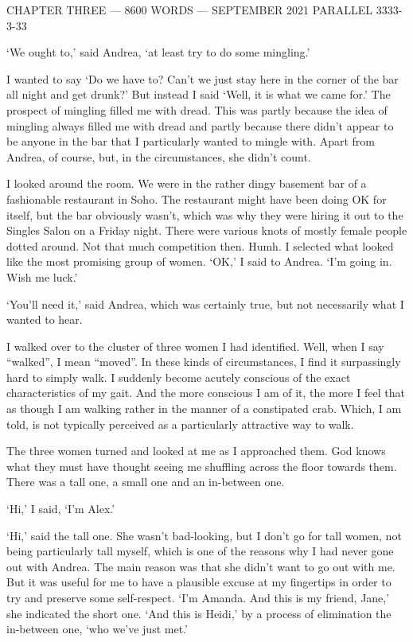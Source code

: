 {\parindent=0pt {\obeylines
{\twelvess CHAPTER THREE --- 8600 WORDS --- SEPTEMBER 2021}
{\twelvess PARALLEL 3333-3-33}}
\vskip 1cm

\twelverm
`We ought to,' said Andrea, `at least try to do some mingling.'}

I wanted to say `Do we have to? Can't we just stay here in the
corner of the bar all night and get drunk?' But instead I said
`Well, it is what we came for.' The prospect of mingling filled me
with dread. This was partly because the idea of mingling always
filled me with dread and partly because there didn't appear to be
anyone in the bar that I particularly wanted to mingle with. Apart
from Andrea, of course, but, in the circumstances, she didn't count.

I looked around the room. We were in the rather dingy basement bar
of a fashionable restaurant in Soho. The restaurant might have been
doing OK for itself, but the bar obviously wasn't, which was why
they were hiring it out to the Singles Salon on a Friday night.
There were various knots of mostly female people dotted around. Not
that much competition then. Humh. I selected what looked like the
most promising group of women. `OK,' I said to Andrea. `I'm going
in. Wish me luck.'

`You'll need it,' said Andrea, which was certainly true, but not
necessarily what I wanted to hear.

I walked over to the cluster of three women I had identified. Well,
when I say ``walked'', I mean ``moved''. In these kinds of
circumstances, I find it surpassingly hard to simply {\twelveit
walk\/}. I suddenly become acutely conscious of the exact
characteristics of my gait. And the more conscious I am of it, the
more I feel that as though I am walking rather in the manner of a
constipated crab. Which, I am told, is not typically perceived as a
particularly attractive way to walk.

The three women turned and looked at me as I approached them. God
knows what they must have thought seeing me shuffling across the
floor towards them. There was a tall one, a small one and an
in-between one.

`Hi,' I said, `I'm Alex.'

`Hi,' said the tall one. She wasn't bad-looking, but I don't go for
tall women, not being particularly tall myself, which is one of the
reasons why I had never gone out with Andrea. The main reason was
that she didn't want to go out with me. But it was useful for me to
have a plausible excuse at my fingertips in order to try and
preserve some self-respect. `I'm Amanda. And this is my friend,
Jane,' she indicated the short one. `And this is Heidi,' by a
process of elimination the in-between one, `who we've just met.'


